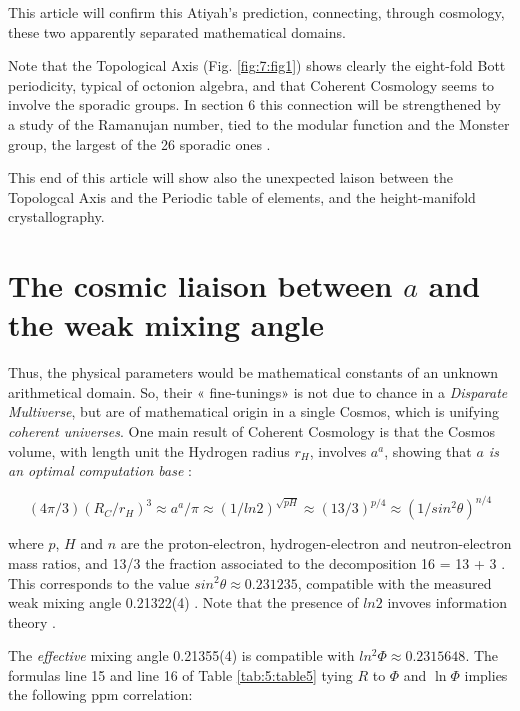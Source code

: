 \documentclass[a4paper,9pt]{article}
\begin{document}
   
   
   This article will confirm this Atiyah's prediction, connecting, through cosmology, these two apparently separated mathematical domains.
   
   
   
   Note that the Topological Axis (Fig. \ref{fig:7:fig1}) shows clearly the eight-fold Bott periodicity, typical of octonion algebra, and that Coherent Cosmology seems to involve the sporadic groups. In section 6 this connection will be strengthened by a study of the Ramanujan number, tied to the modular function and the Monster group, the largest of the 26 sporadic ones \cite{Conway} \cite{Borcherds}.
   
   
   This end of this article will show also the unexpected laison between the Topologcal Axis and the Periodic table of elements, and the height-manifold crystallography.
   

\section{The cosmic liaison between $a$ and the weak mixing angle}

Thus, the physical parameters would be mathematical constants of an unknown arithmetical domain. So, their « fine-tunings» is not due to chance in a \textit {Disparate Multiverse}, but are of mathematical origin in a single Cosmos, which is unifying \textit {coherent universes}. One main result of Coherent Cosmology is that the Cosmos volume, with length unit the Hydrogen radius $r_H$, involves $a^a$, showing that \textit{$a$ is an optimal computation base}  \cite{Sanchez}:

\begin{equation}
    (4\pi /3) (R_C/r_H)^3 \approx a^a/\pi \approx (1/ln2)^{\sqrt{pH}} \approx (13/3)^{p/4} \approx (1/sin^2\theta)^{n/4} 
\end{equation}

where $p$, $H$ and $n$ are the proton-electron, hydrogen-electron and neutron-electron mass ratios, and 13/3 the fraction associated to the decomposition 16 = 13 + 3 \cite{Sanchez1}. This corresponds to the value $sin^2\theta \approx 0.231235$, compatible with the measured weak mixing angle 0.21322(4) \cite{Tanabashi}. Note that the presence of $ln2$ invoves information theory \cite{Shannon}. 

The \textit {effective} mixing angle 0.21355(4) \cite{Tanabashi} is compatible with $ln^2\Phi \approx 0.2315648$. The formulas line 15 and line 16 of Table \ref{tab:5:table5} tying $R$ to $\Phi$ and $\ln\Phi$ implies the following ppm correlation: 
\end{document}
